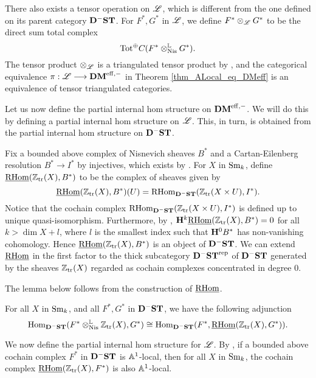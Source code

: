 There also exists a tensor operation on $\ALocal$, which is different
from the one defined on its parent category $\DShCor$.  For $F^*, G^*$
in $\ALocal$, we define $F^* \tAL G^*$ to be the direct sum total 
complex 
\[
\mathrm{Tot}^{\oplus} \suslC[]( F^* \tLNis G^* ).
\]
The tensor product $\tAL$ is a triangulated tensor product
by \cite[14.11]{MVW}, and the categorical equivalence $\pi: 
\ALocal \to \DMeff$ in Theorem \ref{thm_ALocal_eq_DMeff} is an 
equivalence of tensor triangulated categories.

Let us now define the partial internal hom structure on $\DMeff$.
We will do this by defining a partial internal hom structure on
$\ALocal$. This, in turn, is obtained from the partial internal 
hom structure on $\DShCor$.

\begin{defn}\label{def_pihom_DShCor}
Fix a bounded above complex of Nisnevich sheaves $B^*$ and a
Cartan-Eilenberg resolution $B^* \to I^*$ by injectives, which
exists by \cite[6.19]{MVW}. For $X$ in $\Sm$, define 
$\sheaf{\rhom}(\Ztr(X), B^*)$ to be the complex of sheaves given 
by
\[
\sheaf{\rhom}(\Ztr(X), B^*)(U) = \rhom_{\DShCor}(\Ztr(X \times U),
I^*).
\]
Notice that the cochain complex $\rhom_{\DShCor}(\Ztr(X \times U), I^*)$
is defined up to unique quasi-isomorphism. Furthermore, by \cite[3.2.9]{TriCa}, $\HH^k \sheaf{\rhom}(\Ztr(X), B^*) = 0$ for
all $k > \dim X + l$, where $l$ is the smallest index such that
$\HH^0B^*$ has non-vanishing cohomology. Hence $\sheaf{\rhom}(\Ztr(X),
B^*)$ is an object of $\DShCor$. We can extend $\sheaf{\rhom}$ in the
first factor to the thick subcategory $\DShCor^{\compact}$ of 
$\DShCor$ generated by the sheaves $\Ztr(X)$ regarded as
cochain complexes concentrated in degree 0.
\end{defn}

The lemma below follows from the construction of $\sheaf{\rhom}$.

\begin{lem}\label{lem_ihom_tL_adjunction}
For all $X$ in $\Sm$, and all $F^*, G^*$ in $\DShCor$, we 
have the following adjunction
\[
\hom_{\DShCor}(F^*\tLNis \Ztr(X), G^*) \cong
\hom_{\DShCor}(F^*, \sheaf{\rhom}(\Ztr(X), G^*)).
\]
\end{lem}

We now define the partial internal hom structure for $\ALocal$.  By
\cite[14.12]{MVW}, if a bounded above cochain complex $F^*$ in
$\DShCor$ is $\A^1$-local, then for all $X$ in $\Sm$, the cochain
complex $\sheaf{\rhom}(\Ztr(X), F^*)$ is also $\A^1$-local.

